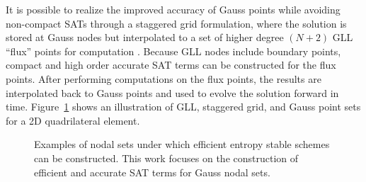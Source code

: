\documentclass[onefignum,onetabnum,final]{siamart171218}
\begin{document}
It is possible to realize the improved accuracy of Gauss points while avoiding non-compact SATs through a staggered grid formulation, where the solution is stored at Gauss nodes but interpolated to a set of higher degree $(N+2)$ GLL ``flux'' points for computation \cite{parsani2016entropy}.  Because GLL nodes include boundary points, compact and high order accurate SAT terms can be constructed for the flux points.  After performing computations on the flux points, the results are interpolated back to Gauss points and used to evolve the solution forward in time.  Figure~\ref{fig:nodesets} shows an illustration of GLL, staggered grid, and Gauss point sets for a 2D quadrilateral element.  

\begin{figure}
\centering
{}
\hspace{.5em}
\hspace{.5em}
\caption{Examples of nodal sets under which efficient entropy stable schemes can be constructed.  This work focuses on the construction of efficient and accurate SAT terms for Gauss nodal sets.}
\label{fig:nodesets}
\end{figure}
\end{document}
